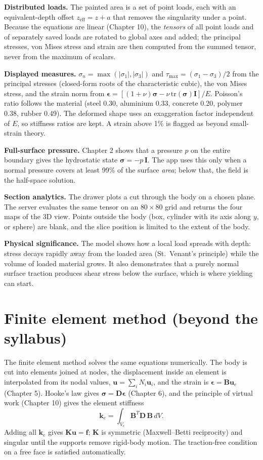 \documentclass[11pt,a4paper]{article}
\newcommand{\tens}[1]{\bm{#1}}
\newcommand{\sig}[1]{\par\smallskip\noindent\textbf{Physical significance.} #1}
\begin{document}
\textbf{Distributed loads.} The painted area is a set of point loads, each with an equivalent-depth offset $z_{\text{eff}}=z+a$ that removes the singularity under a point. Because the equations are linear (Chapter 10), the \emph{tensors} of all point loads and of separately saved loads are rotated to global axes and added; the principal stresses, von Mises stress and strain are then computed from the summed tensor, never from the maximum of scalars.

\textbf{Displayed measures.} $\sigma_n=\max(|\sigma_1|,|\sigma_3|)$ and $\tau_{\max}=(\sigma_1-\sigma_3)/2$ from the principal stresses (closed-form roots of the characteristic cubic), the von Mises stress, and the strain norm from $\tens\epsilon=[(1+\nu)\tens\sigma-\nu\,\mathrm{tr}(\tens\sigma)\mathbf I]/E$. Poisson's ratio follows the material (steel 0.30, aluminium 0.33, concrete 0.20, polymer 0.38, rubber 0.49). The deformed shape uses an exaggeration factor independent of $E$, so stiffness ratios are kept. A strain above 1\% is flagged as beyond small-strain theory.

\textbf{Full-surface pressure.} Chapter 2 shows that a pressure $p$ on the entire boundary gives the hydrostatic state $\tens\sigma=-p\,\mathbf I$. The app uses this only when a normal pressure covers at least 99\% of the surface \emph{area}; below that, the field is the half-space solution.

\textbf{Section analytics.} The drawer plots a cut through the body on a chosen plane. The server evaluates the same tensor on an $80\times80$ grid and returns the four maps of the 3D view. Points outside the body (box, cylinder with its axis along $y$, or sphere) are blank, and the slice position is limited to the extent of the body.

\sig{The model shows how a local load spreads with depth: stress decays rapidly away from the loaded area (St.\ Venant's principle) while the volume of loaded material grows. It also demonstrates that a purely normal surface traction produces shear stress below the surface, which is where yielding can start.}

\section{Finite element method (beyond the syllabus)}
The finite element method solves the same equations numerically. The body is cut into elements joined at nodes, the displacement inside an element is interpolated from its nodal values, $\mathbf u=\sum_iN_i\mathbf u_i$, and the strain is $\tens\epsilon=\mathbf B\mathbf u_e$ (Chapter 5). Hooke's law gives $\tens\sigma=\mathbf D\tens\epsilon$ (Chapter 6), and the principle of virtual work (Chapter 10) gives the element stiffness
\begin{equation}
\mathbf k_e=\int_{V_e}\mathbf B^{T}\mathbf D\,\mathbf B\,dV .
\end{equation}
Adding all $\mathbf k_e$ gives $\mathbf K\mathbf u=\mathbf f$; $\mathbf K$ is symmetric (Maxwell--Betti reciprocity) and singular until the supports remove rigid-body motion. The traction-free condition on a free face is satisfied automatically.
\end{document}
